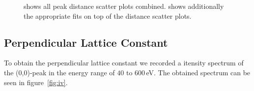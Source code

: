 \documentclass[a4paper,10pt]{scrartcl}
\begin{document}
\begin{figure}
\centering
{}
\caption{ shows all peak distance scatter plots combined.  shows additionally the appropriate fits on top of the distance scatter plots.}
\end{figure}

\subsection{Perpendicular Lattice Constant}

To obtain the perpendicular lattice constant we recorded a itensity spectrum of the (0,0)-peak in the energy range of $40$ to $600\,$eV. The obtained spectrum can be seen in figure~\ref{fig:iv}.
\end{document}
